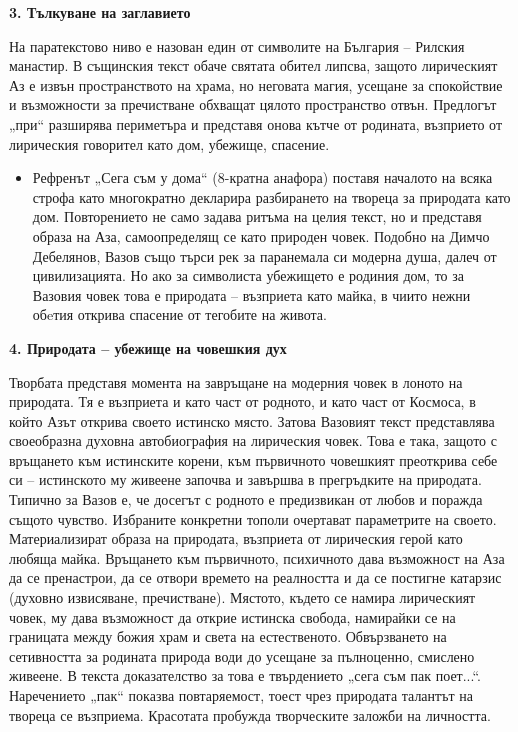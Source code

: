 \documentclass[12pt,a4paper]{article}
\begin{document}
\vspace{0.1cm}
\textbf{3. Тълкуване на заглавието}
\vspace{0.1cm}

\indent На паратекстово ниво е назован един от символите на България – Рилския манастир. В същинския текст обаче святата обител липсва, защото лирическият Аз е извън пространството на храма, но неговата магия, усещане за спокойствие и възможности за пречистване обхващат цялото пространство отвън. Предлогът „при“ разширява периметъра и представя онова кътче от родината, възприето от лирическия говорител като дом, убежище, спасение.

\vspace{0.1cm}
\begin{itemize}[leftmargin=*, noitemsep, topsep=2pt, parsep=0pt]
    \item Рефренът „Сега съм у дома“ (8-кратна анафора) поставя началото на всяка строфа като многократно декларира разбирането на твореца за природата като дом. Повторението не само задава ритъма на целия текст, но и представя образа на Аза, самоопределящ се като природен човек. Подобно на Димчо Дебелянов, Вазов също търси рек за паранемала си модерна душа, далеч от цивилизацията. Но ако за символиста убежището е родиния дом, то за Вазовия човек това е природата – възприета като майка, в чиито нежни обeтия открива спасение от тегобите на живота.
\end{itemize}

\vspace{0.1cm}
\textbf{4. Природата – убежище на човешкия дух}
\vspace{0.1cm}

\indent Творбата представя момента на завръщане на модерния човек в лоното на природата. Тя е възприета и като част от родното, и като част от Космоса, в който Азът открива своето истинско място. Затова Вазовият текст представлява своеобразна духовна автобиография на лирическия човек. Това е така, защото с връщането към истинските корени, към първичното човешкият преоткрива себе си – истинското му живеене започва и завършва в прегръдките на природата. Типично за Вазов е, че досегът с родното е предизвикан от любов и поражда същото чувство. Избраните конкретни тополи очертават параметрите на своето. Материализират образа на природата, възприета от лирическия герой като любяща майка. Връщането към първичното, психичното дава възможност на Аза да се пренастрои, да се отвори времето на реалността и да се постигне катарзис (духовно извисяване, пречистване). Мястото, където се намира лирическият човек, му дава възможност да открие истинска свобода, намирайки се на границата между божия храм и света на естественото. Обвързването на сетивността за родината природа води до усещане за пълноценно, смислено живеене. В текста доказателство за това е твърдението „сега съм пак поет...“. Наречението „пак“ показва повтаряемост, тоест чрез природата талантът на твореца се възприема. Красотата пробужда творческите заложби на личността.
\end{document}
